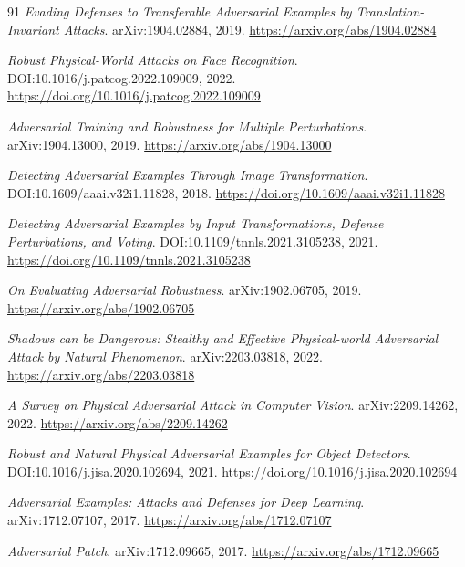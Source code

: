 \documentclass[11pt,a4paper]{article}
\begin{document}
\begin{thebibliography}{91}
\newblock \emph{Evading Defenses to Transferable Adversarial Examples by Translation-Invariant Attacks}.
\newblock arXiv:1904.02884, 2019.
\newblock \url{https://arxiv.org/abs/1904.02884}

\newblock \emph{Robust Physical-World Attacks on Face Recognition}.
\newblock DOI:10.1016/j.patcog.2022.109009, 2022.
\newblock \url{https://doi.org/10.1016/j.patcog.2022.109009}

\newblock \emph{Adversarial Training and Robustness for Multiple Perturbations}.
\newblock arXiv:1904.13000, 2019.
\newblock \url{https://arxiv.org/abs/1904.13000}

\newblock \emph{Detecting Adversarial Examples Through Image Transformation}.
\newblock DOI:10.1609/aaai.v32i1.11828, 2018.
\newblock \url{https://doi.org/10.1609/aaai.v32i1.11828}

\newblock \emph{Detecting Adversarial Examples by Input Transformations, Defense Perturbations, and Voting}.
\newblock DOI:10.1109/tnnls.2021.3105238, 2021.
\newblock \url{https://doi.org/10.1109/tnnls.2021.3105238}

\newblock \emph{On Evaluating Adversarial Robustness}.
\newblock arXiv:1902.06705, 2019.
\newblock \url{https://arxiv.org/abs/1902.06705}

\newblock \emph{Shadows can be Dangerous: Stealthy and Effective Physical-world Adversarial Attack by Natural Phenomenon}.
\newblock arXiv:2203.03818, 2022.
\newblock \url{https://arxiv.org/abs/2203.03818}

\newblock \emph{A Survey on Physical Adversarial Attack in Computer Vision}.
\newblock arXiv:2209.14262, 2022.
\newblock \url{https://arxiv.org/abs/2209.14262}

\newblock \emph{Robust and Natural Physical Adversarial Examples for Object Detectors}.
\newblock DOI:10.1016/j.jisa.2020.102694, 2021.
\newblock \url{https://doi.org/10.1016/j.jisa.2020.102694}

\newblock \emph{Adversarial Examples: Attacks and Defenses for Deep Learning}.
\newblock arXiv:1712.07107, 2017.
\newblock \url{https://arxiv.org/abs/1712.07107}

\newblock \emph{Adversarial Patch}.
\newblock arXiv:1712.09665, 2017.
\newblock \url{https://arxiv.org/abs/1712.09665}


\end{thebibliography}
\end{document}
